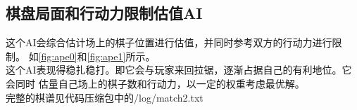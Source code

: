 \documentclass[a4paper]{article}
\begin{document}
\subsection{棋盘局面和行动力限制估值AI}
这个AI会综合估计场上的棋子位置进行估值，并同时参考双方的行动力进行限制。
如\autoref{fig:ape0}和\autoref{fig:ape1}所示。\\

这个AI表现得稳扎稳打。即它会与玩家来回拉锯，逐渐占据自己的有利地位。它会同时
估量自己场上的棋子数和行动力，以一定的权重考虑最优解。\\

完整的棋谱见代码压缩包中的/log/match2.txt\\

\begin{figure}[!hbt]
\begin{minipage}{0.4\textwidth}
    \centering

\end{minipage}
\end{figure}
\end{document}
